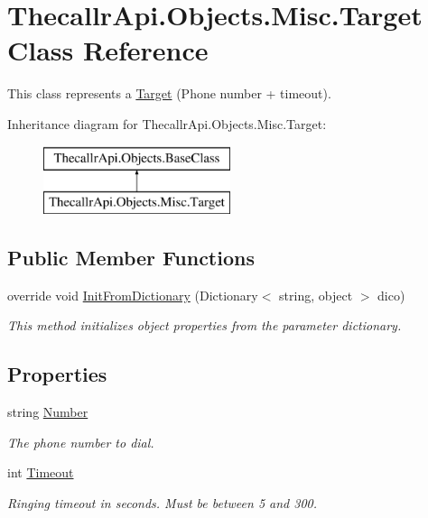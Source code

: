 \hypertarget{class_thecallr_api_1_1_objects_1_1_misc_1_1_target}{\section{Thecallr\+Api.\+Objects.\+Misc.\+Target Class Reference}
\label{class_thecallr_api_1_1_objects_1_1_misc_1_1_target}
}


This class represents a \hyperlink{class_thecallr_api_1_1_objects_1_1_misc_1_1_target}{Target} (Phone number + timeout).  


Inheritance diagram for Thecallr\+Api.\+Objects.\+Misc.\+Target\+:\begin{figure}[H]
\begin{center}
\leavevmode
\includegraphics[height=2.000000cm]{class_thecallr_api_1_1_objects_1_1_misc_1_1_target}
\end{center}
\end{figure}
\subsection*{Public Member Functions}
\begin{DoxyCompactItemize}
\item 
override void \hyperlink{class_thecallr_api_1_1_objects_1_1_misc_1_1_target_a3a5a454a04c39c6863c39477997f3eb0}{Init\+From\+Dictionary} (Dictionary$<$ string, object $>$ dico)
\begin{DoxyCompactList}\small\item\em This method initializes object properties from the parameter dictionary. \end{DoxyCompactList}\end{DoxyCompactItemize}
\subsection*{Properties}
\begin{DoxyCompactItemize}
\item 
string \hyperlink{class_thecallr_api_1_1_objects_1_1_misc_1_1_target_a78dc2541ddc3a5377bb1cb967c2750ce}{Number}
\begin{DoxyCompactList}\small\item\em The phone number to dial. \end{DoxyCompactList}\item 
int \hyperlink{class_thecallr_api_1_1_objects_1_1_misc_1_1_target_a437174a996cedda178c6520adb9bcd70}{Timeout}
\begin{DoxyCompactList}\small\item\em Ringing timeout in seconds. Must be between 5 and 300. \end{DoxyCompactList}\end{DoxyCompactItemize}


